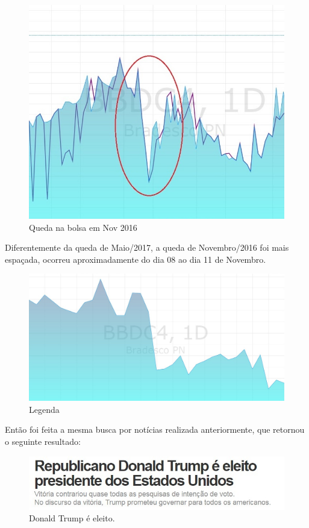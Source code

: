 \documentclass{sigchi}
\begin{document}
\begin{figure}[!htb]
\centering
\includegraphics[scale=0.90]{./figures/queda-2016.jpg}
\caption{Queda na bolsa em Nov 2016}
\label{fig3}
\end{figure}
Diferentemente da queda de Maio/2017, a queda de Novembro/2016 foi mais espaçada, ocorreu aproximadamente do dia 08 ao dia 11 de Novembro.

\begin{figure}[!htb]
	\centering
	\includegraphics[scale=0.25]{./figures/queda-2016-bradesco.jpg}
	\caption{Legenda}
	\label{figRotu}
\end{figure}
Então foi feita a mesma busca por notícias realizada anteriormente, que retornou o seguinte resultado: 
\begin{figure}[!htb]
	\centering
	\includegraphics[scale=0.4]{./figures/figura7.jpg}
\caption{Donald Trump é eleito.}
	\label{figRotu}
\end{figure}
\end{document}
